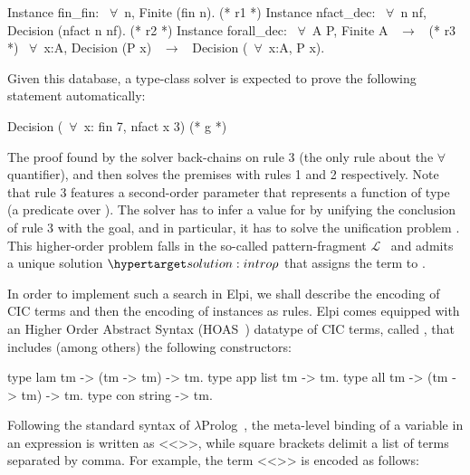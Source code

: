 \documentclass[sigconf,natbib=false,review]{acmart}
\newcommand{\llambda}{\ensuremath{\mathcal{L}}\xspace}
\begin{document}
\begin{coqcode}
Instance fin_fin: ~$\forall$~n, Finite (fin n).             (* r1 *)
Instance nfact_dec: ~$\forall$~n nf, Decision (nfact n nf). (* r2 *)
Instance forall_dec: ~$\forall$~A P, Finite A ~$\to$~            (* r3 *)
  ~$\forall$~x:A, Decision (P x) ~$\to$~ Decision (~$\forall$~x:A, P x).
\end{coqcode}

\noindent Given this database, a type-class solver is expected to
prove the following statement automatically:

\begin{coqcode}
  Decision (~$\forall$~x: fin 7, nfact x 3)                   (* g *)
\end{coqcode}

\noindent
The proof found by the solver back-chains on rule 3 (the only rule
about the $\forall$ quantifier), and then solves the premises with
rules 1 and 2 respectively.
Note that rule 3 features a second-order parameter  that represents
a function of type  (a predicate over ).
The solver has to infer a value for  by unifying the conclusion
of rule 3 with the goal, and in particular, it has to solve the unification
problem . This higher-order problem falls in the so-called 
pattern-fragment \llambda~\cite{miller92jsc} and admits a unique
solution $\customlabel{solution:intro}{\rho}$ that assigns
the term  to .

In order to implement such a search in Elpi, we shall describe the encoding
of CIC terms and then the encoding of instances as rules.
Elpi comes equipped with
an Higher Order Abstract Syntax (HOAS~\cite{10.1145/53990.54010}) datatype of CIC
terms, called , that includes (among others) the following
constructors:

\begin{elpicode}
type lam  tm -> (tm -> tm) -> tm.     %
type app  list tm -> tm.              %
type all  tm -> (tm -> tm) -> tm.     %
type con  string -> tm.               %
\end{elpicode}

\noindent
Following the standard syntax of $\lambda$Prolog~\cite{miller_nadathur_2012},
the meta-level binding of a variable  in an expression
 is written as <<>>, while square brackets delimit a
list of terms separated by comma. For example, the term
<<>> is encoded as follows:
\end{document}
